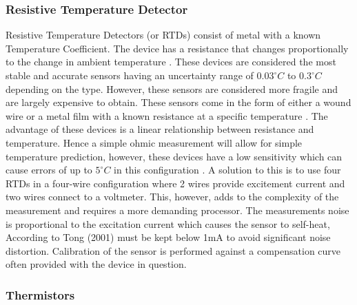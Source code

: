 \subsubsection{Resistive Temperature Detector}

Resistive Temperature Detectors (or RTDs) consist of metal with a known Temperature Coefficient. The device has a resistance that changes proportionally to the change in ambient temperature \cite{tong2001improving}. These devices are considered the most stable and accurate sensors \cite{tong2001improving} having an uncertainty range of $0.03^\circ C$ to $0.3^\circ C$ depending on the type. However, these sensors are considered more fragile and are largely expensive to obtain. These sensors come in the form of either a wound wire or a metal film with a known resistance at a specific temperature \cite{tong2001improving}. The advantage of these devices is a linear relationship between resistance and temperature. Hence a simple ohmic measurement \cite{tong2001improving} will allow for simple temperature prediction, however, these devices have a low sensitivity which can cause errors of up to $5 ^\circ C$ in this configuration \cite{tong2001improving}. A solution to this is to use four RTDs in a four-wire configuration where 2 wires provide excitement current and two wires connect to a voltmeter. This, however, adds to the complexity of the measurement and requires a more demanding processor. The measurements noise is proportional to the excitation current which causes the sensor to self-heat, According to Tong (2001) must be kept below 1mA to avoid significant noise distortion. Calibration of the sensor is performed against a compensation curve often provided with the device in question.
\subsubsection{Thermistors}

